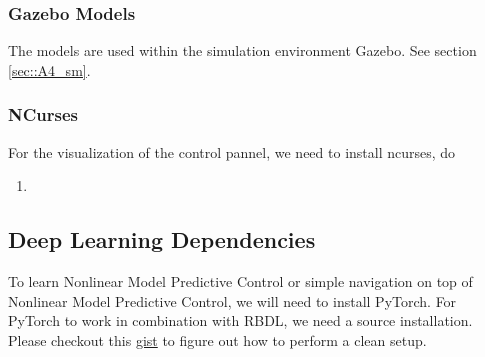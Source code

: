 \subsubsection{Gazebo Models}
The models are used within the simulation environment Gazebo. See section \ref{sec::A4_sm}.
\subsubsection{NCurses}
For the visualization of the control pannel, we need to install ncurses, do
\begin{enumerate}
	\item {}
\end{enumerate}
\subsection{Deep Learning Dependencies}
\label{sec::A53_dl}
To learn Nonlinear Model Predictive Control or simple navigation on top of Nonlinear Model Predictive Control, we will need to install PyTorch. For PyTorch to work in combination with RBDL, we need a source installation. Please checkout this \href{https://gist.github.com/mhubii/1c1049fb5043b8be262259efac4b89d5}{gist} to figure out how to perform a clean setup.
